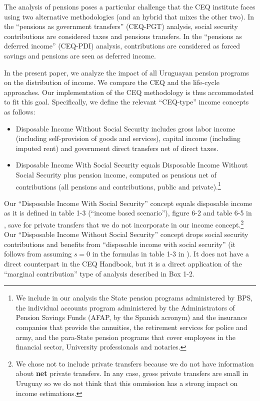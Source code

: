 \documentclass{article}
\begin{document}
The analysis of pensions poses a particular challenge that the CEQ institute faces using two alternative methodologies (and an hybrid that mixes the other two). In the ``pensions as government transfers'' (CEQ-PGT) analysis, social security contributions are considered taxes and pensions transfers. In the ``pensions as deferred income'' (CEQ-PDI) analysis, contributions are considered as forced savings and pensions are seen as deferred income.   

In the present paper, we analyze the impact of all Uruguayan pension programs on the distribution of income. We compare the CEQ and the life-cycle approaches. Our implementation of the CEQ methodology is thus accommodated to fit this goal. Specifically, we define the relevant ``CEQ-type'' income  concepts as follows:
\begin{itemize}
    \item Disposable Income Without Social Security includes gross labor income (including self-provision of goods and services), capital income (including imputed rent) and government direct transfers net of direct taxes.
    \item Disposable Income With Social Security equals Disposable Income Without Social Security plus pension income, computed as pensions net of contributions (all pensions and contributions, public and private).\footnote{We include in our analysis the State pension programs administered by BPS, the individual accounts program administered by the Administrators of Pension Savings Funds (AFAP, by the Spanish acronym) and the insurance companies that provide the annuities, the retirement services for police and army, and the para-State pension programs that cover employees in the financial sector, University professionals and notaries.}
\end{itemize}
 
Our ``Disposable Income With Social Security'' concept equals disposable income  as it is defined in table 1-3 (``income based scenario''), figure 6-2 and table 6-5 in \textcite{Lustig2022a}, save for private transfers that we do not incorporate in our income concept.\footnote{We chose not to include private transfers because we do not have information about \textbf{net} private transfers. In any case, gross private transfers are small in Uruguay so we do not think that this ommission has a strong impact on income estimations.} Our ``Disposable Income Without Social Security'' concept drops social security contributions and benefits from ``disposable income with social security'' (it follows from assuming $s=0$ in the formulas in table 1-3 in \citeauthor{Lustig2022a}). It does not have a direct counterpart in the CEQ Handbook, but it is a direct application of the ``marginal contribution'' type of analysis described in Box 1-2.   
\end{document}

